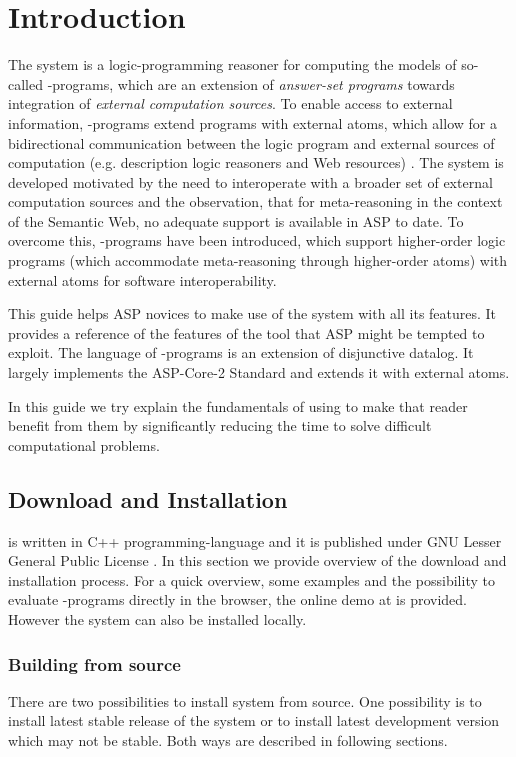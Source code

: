 \documentclass[14pt,a4paper, titlepage]{article}
\begin{document}
\section{Introduction} %
The \dlvhex{} system is a logic-programming reasoner for computing the models of so-called \hex{}-programs, which are an extension of \emph{answer-set programs} towards integration of \emph{external computation sources}. To enable access to external information, \hex{}-programs extend programs with external atoms, which allow for a bidirectional communication between the logic program and external sources of computation (e.g. description logic reasoners and Web resources) \cite{extatoms}. The system is developed motivated by the need to interoperate with a broader set of external computation sources and the observation, that for meta-reasoning in the context of the Semantic Web, no adequate support is available in ASP to date. To overcome this, \hex{}-programs have been introduced, which support higher-order logic programs (which accommodate meta-reasoning through higher-order atoms) with external atoms for software interoperability.

This guide helps ASP novices to make use of the system with all its features. It provides a reference of the features of the tool that ASP might be tempted to exploit. The language of \hex{}-programs is an extension of disjunctive datalog. It largely implements the ASP-Core-2 Standard \cite{ref} and extends it with external atoms. 

In this guide we try explain the fundamentals of using \dlvhex{} to make that reader benefit from them by significantly reducing the time to solve difficult computational problems. 

\subsection{Download and Installation}
\dlvhex{} is written in C++ programming-language and it is published under GNU Lesser General Public License \cite{licnc}. In this section we provide overview of the download and installation process. For a quick overview, some examples and the possibility to evaluate \hex{}-programs directly in the browser, the online demo at \cite{onlinedemo} is provided. However the system can also be installed locally. 

\subsubsection{Building from source}
There are two possibilities to install \dlvhex{} system from source. One possibility is to install latest stable release of the system or to install latest development version which may not be stable. Both ways are described in following sections.  
\end{document}
